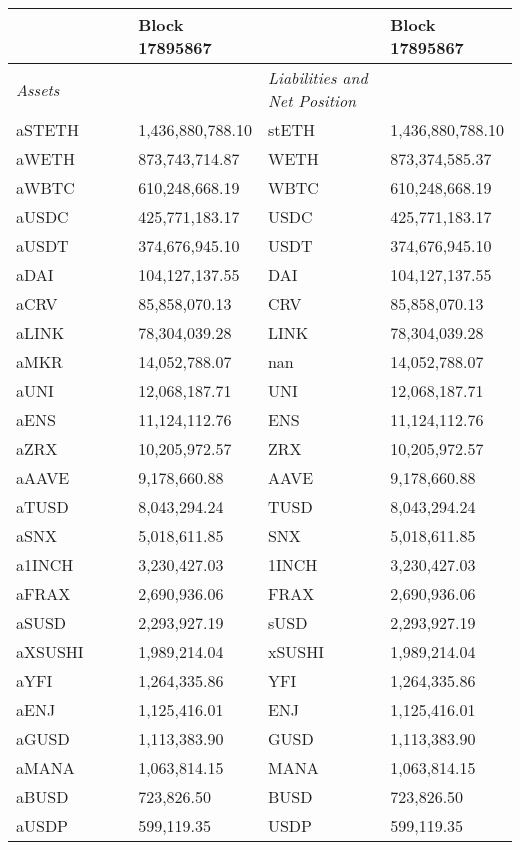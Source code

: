 
\begin{longtable}{@{}p{0.25\linewidth}p{0.25\linewidth}p{0.25\linewidth}p{0.25\linewidth}@{}}

\toprule


& Block 17895867 & & Block 17895867 \\

\midrule
\textit{Assets} & & \textit{Liabilities and Net Position} \\
aSTETH & 1,436,880,788.10 & stETH &1,436,880,788.10 \\
aWETH & 873,743,714.87 & WETH &873,374,585.37 \\
aWBTC & 610,248,668.19 & WBTC &610,248,668.19 \\
aUSDC & 425,771,183.17 & USDC &425,771,183.17 \\
aUSDT & 374,676,945.10 & USDT &374,676,945.10 \\
aDAI & 104,127,137.55 & DAI &104,127,137.55 \\
aCRV & 85,858,070.13 & CRV &85,858,070.13 \\
aLINK & 78,304,039.28 & LINK &78,304,039.28 \\
aMKR & 14,052,788.07 & nan &14,052,788.07 \\
aUNI & 12,068,187.71 & UNI &12,068,187.71 \\
aENS & 11,124,112.76 & ENS &11,124,112.76 \\
aZRX & 10,205,972.57 & ZRX &10,205,972.57 \\
aAAVE & 9,178,660.88 & AAVE &9,178,660.88 \\
aTUSD & 8,043,294.24 & TUSD &8,043,294.24 \\
aSNX & 5,018,611.85 & SNX &5,018,611.85 \\
a1INCH & 3,230,427.03 & 1INCH &3,230,427.03 \\
aFRAX & 2,690,936.06 & FRAX &2,690,936.06 \\
aSUSD & 2,293,927.19 & sUSD &2,293,927.19 \\
aXSUSHI & 1,989,214.04 & xSUSHI &1,989,214.04 \\
aYFI & 1,264,335.86 & YFI &1,264,335.86 \\
aENJ & 1,125,416.01 & ENJ &1,125,416.01 \\
aGUSD & 1,113,383.90 & GUSD &1,113,383.90 \\
aMANA & 1,063,814.15 & MANA &1,063,814.15 \\
aBUSD & 723,826.50 & BUSD &723,826.50 \\
aUSDP & 599,119.35 & USDP &599,119.35 \\

\end{longtable}

